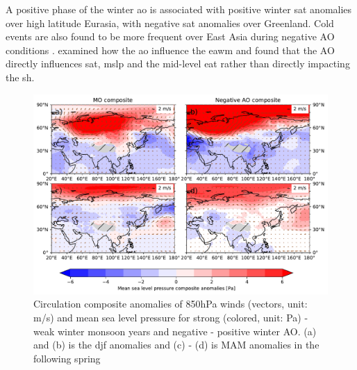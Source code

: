 A positive phase of the winter \acrshort{ao} is associated with positive winter \acrfull{sat} anomalies over high latitude Eurasia, with negative \acrshort{sat} anomalies over Greenland. 
Cold events are also found to be more frequent over East Asia during negative AO conditions \parencite{he2017impact}.
\textcite{wu2002winter} examined how the \acrshort{ao} influence the \acrshort{eawm} and found that the AO directly influences  \acrshort{sat}, \acrshort{mslp} and the mid-level \acrshort{eat} rather than directly impacting the \acrshort{sh}.

\begin{figure}[htpb]
    \centering
    \includegraphics[width=\textwidth]{texfiles/figs/winter_MO_AO_composite.pdf}
    \caption{Circulation composite anomalies of 850hPa winds (vectors, unit: m/s) and mean sea level pressure for strong (colored, unit: Pa) - weak winter monsoon years and negative - positive winter AO. (a) and (b) is the \acrshort{djf} anomalies and (c) - (d) is MAM anomalies in the following spring}
    \label{fig:mo_ao_composite}
\end{figure}
 

